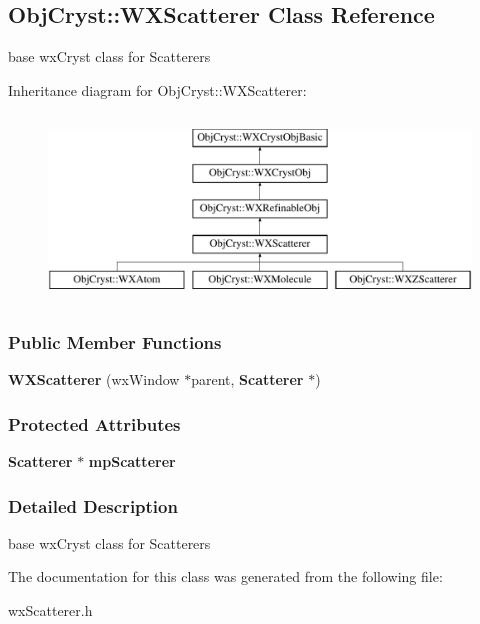 \subsection{\-Obj\-Cryst\-:\-:\-W\-X\-Scatterer \-Class \-Reference}
\label{a00145}


base wx\-Cryst class for \-Scatterers  


\-Inheritance diagram for \-Obj\-Cryst\-:\-:\-W\-X\-Scatterer\-:\begin{figure}[H]
\begin{center}
\leavevmode
\includegraphics[height=5.000000cm]{a00145}
\end{center}
\end{figure}
\subsubsection*{\-Public \-Member \-Functions}
\begin{DoxyCompactItemize}
\item 
{\bfseries \-W\-X\-Scatterer} (wx\-Window $\ast$parent, {\bf \-Scatterer} $\ast$)\label{a00145_a43a37c79f9dca837a55fe024a06fddd6}

\end{DoxyCompactItemize}
\subsubsection*{\-Protected \-Attributes}
\begin{DoxyCompactItemize}
\item 
{\bf \-Scatterer} $\ast$ {\bfseries mp\-Scatterer}\label{a00145_a60b8f362b1735a8942e2991994d5c862}

\end{DoxyCompactItemize}


\subsubsection{\-Detailed \-Description}
base wx\-Cryst class for \-Scatterers 

\-The documentation for this class was generated from the following file\-:\begin{DoxyCompactItemize}
\item 
wx\-Scatterer.\-h\end{DoxyCompactItemize}
